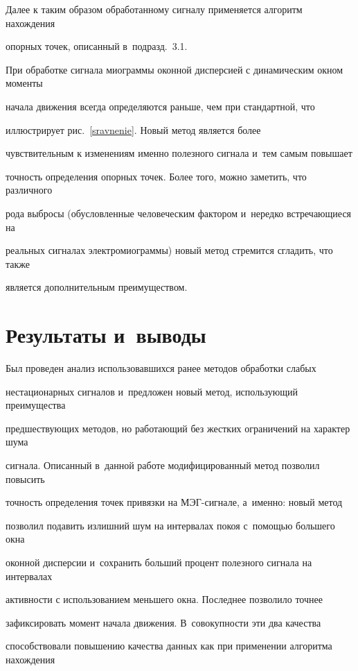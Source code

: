 Далее к таким образом обработанному сигналу применяется алгоритм на\-хож\-дения 

опорных точек, описанный в~подразд.~3.1.



При обработке сигнала миограммы оконной дисперсией с динамическим окном моменты 

начала движения всегда определяются раньше, чем при стандартной, что 

иллюстрирует рис.~\ref{sravnenie}. Новый метод является более 

чувствительным к изменениям именно полезного сигнала и~тем самым повышает 

точность определения опорных точек. Более того, можно заметить, что различного 

рода выбросы (обусловленные человеческим фактором и~нередко встречающиеся на 

реальных сигналах электромиограммы) новый метод стремится сгладить, что также 

является дополнительным преимуществом.



\section{Результаты и~выводы}



Был проведен анализ использовавшихся ранее методов обработки слабых 

нестационарных сигналов и~предложен новый метод, использующий преимущества 

предшествующих методов, но работающий без жестких ограничений на характер шума 

сигнала. Описанный в~данной работе модифицированный метод позволил повысить 

точность определения точек привязки на МЭГ-сиг\-на\-ле, а~именно: новый метод 

позволил подавить излишний шум на интервалах покоя с~по\-мощью большего окна 

оконной дисперсии и~сохранить больший процент полезного сигнала на интервалах 

активности с использованием меньшего окна. Последнее позволило точнее 

зафиксировать момент начала движения. В~совокупности эти два качества 

способствовали повышению качества данных как при применении алгоритма нахождения 

